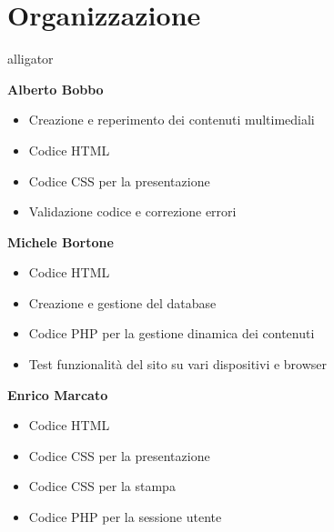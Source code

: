 \documentclass[10pt, a4paper]{article}
\begin{document}
\section{Organizzazione}
\begin{labeling}{alligator}
	\item[\textbf{Alberto Bobbo}] \item[] %
		\begin{itemize}
			\item{Creazione e reperimento dei contenuti multimediali}
			\item{Codice HTML }
			\item{Codice CSS per la presentazione}
			\item{Validazione codice e correzione errori}
		\end{itemize}
	\item[\textbf{Michele Bortone}] \item[]
		\begin{itemize}
			\item{Codice HTML}
			\item{Creazione e gestione del database}
			\item{Codice PHP per la gestione dinamica dei contenuti}
			\item{Test funzionalità del sito su vari dispositivi e browser}
		\end{itemize}
	\item[\textbf{Enrico Marcato}] \item[]
		\begin{itemize}
			\item{Codice HTML }
			\item{Codice CSS per la presentazione}
			\item{Codice CSS per la stampa}
			\item{Codice PHP per la sessione utente   }
		\end{itemize}
\end{labeling}
\end{document}
